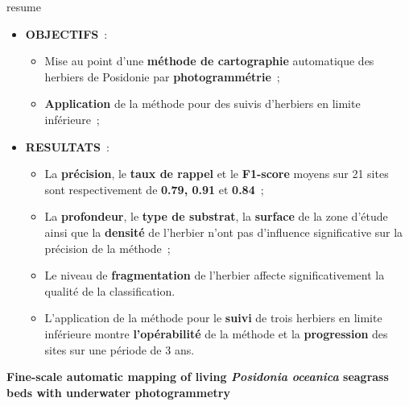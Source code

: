 \setlength{\fboxsep}{8pt}
\setlength{\fboxrule}{0pt}
\begin{center}
\begin{colbox}{resume}
  \vspace{-2pt}
{\color{textresume}\small
\begin{itemize}[leftmargin=0in]\itemsep3pt
\item \textbf{OBJECTIFS}~:
    \begin{itemize}
      \item Mise au point d'une \textbf{méthode de cartographie} automatique des herbiers de Posidonie par \textbf{photogrammétrie}~;
      \item \textbf{Application} de la méthode pour des suivis d'herbiers en limite inférieure~;
    \end{itemize}
\item \textbf{RESULTATS}~:
    \begin{itemize}
      \item La \textbf{précision}, le \textbf{taux de rappel} et le \textbf{F1-score} moyens sur 21 sites sont respectivement de \textbf{0.79, 0.91} et \textbf{0.84}~;
      \item La \textbf{profondeur}, le \textbf{type de substrat}, la \textbf{surface} de la zone d'étude ainsi que la \textbf{densité} de l'herbier n'ont pas d'influence significative sur la précision de la méthode~;
      \item Le niveau de \textbf{fragmentation} de l'herbier affecte significativement la qualité de la classification.
      \item L'application de la méthode pour le \textbf{suivi} de trois herbiers en limite inférieure montre \textbf{l'opérabilité} de la méthode et la \textbf{progression} des sites sur une période de 3 ans.
    \end{itemize}
\end{itemize}
}
\vspace{-2pt}
\end{colbox}
\end{center}

\clearpage

\fontsize{14}{14}\noindent\textbf{Fine-scale automatic mapping of living \textit{Posidonia oceanica} seagrass beds with underwater photogrammetry}

\normalsize
\medskip


